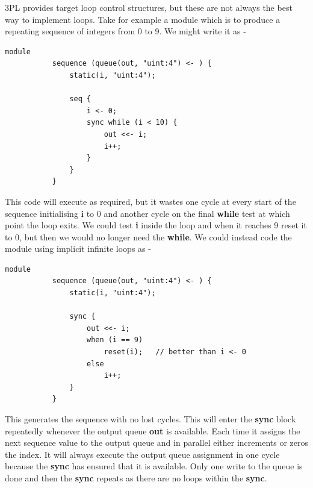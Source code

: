         3PL provides target loop control structures, but these are not
        always the best way to implement loops. Take for example a
        module which is to produce a repeating sequence of integers
        from 0 to 9. We might write it as -
        \begin{lstlisting}[gobble=8, language=threepl]
           module
           sequence (queue(out, "uint:4") <- ) {
               static(i, "uint:4");
               
               seq {
                   i <- 0;
                   sync while (i < 10) {
                       out <<- i;
                       i++;
                   }
               }
           }
        \end{lstlisting}
        This code will execute as required, but it wastes one cycle at every
        start of the sequence initialising {\bf i} to 0 and another cycle on the
        final {\bf while} test at which point the loop exits. We could test {\bf
        i} inside the loop and when it reaches 9 reset it to 0, but then we
        would no longer need the {\bf while}. We could instead code the module
        using implicit infinite loops as -
        \begin{lstlisting}[gobble=8, language=threepl]
           module
           sequence (queue(out, "uint:4") <- ) {
               static(i, "uint:4");
               
               sync {
                   out <<- i;
                   when (i == 9)
                       reset(i);   // better than i <- 0
                   else
                       i++;
               }
           }
        \end{lstlisting}
        This generates the sequence with no lost cycles. This
        will enter the {\bf sync} block repeatedly whenever the output
        queue {\bf out} is available. Each time it assigns the next sequence
        value to the output queue and in parallel either increments or zeros
        the index. It will always execute the output queue assignment in one
        cycle because the {\bf sync} has ensured that it is available. Only
        one write to the queue is done and then the {\bf sync} repeats as there
        are no loops within the {\bf sync}.
        
